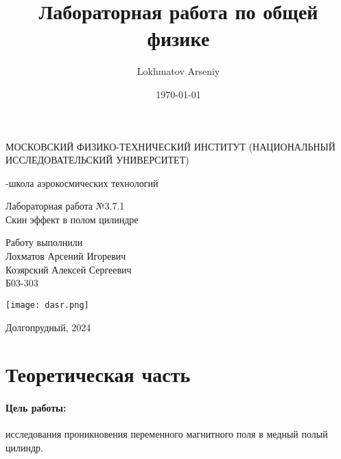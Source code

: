 \documentclass[a4paper,12pt]{article} %
\author{Lokhmatov Arseniy}
\title{Лабораторная работа по общей физике}
\date{\today}
\begin{document}
\begin{titlepage}
    \newpage
    \begin{center}
    {\large МОСКОВСКИЙ ФИЗИКО-ТЕХНИЧЕСКИЙ ИНСТИТУТ (НАЦИОНАЛЬНЫЙ ИССЛЕДОВАТЕЛЬСКИЙ УНИВЕРСИТЕТ)}
    \vspace{1cm}

    {-школа аэрокосмических технологий}
    \vspace{6em}
    \end{center}
    
    \vspace{1.2em}

    \begin{center}
    \Large Лабораторная работа №3.7.1 \\
    Скин эффект в полом цилиндре
    \linebreak
    \end{center}
    
    \vspace{11em}
    
    \begin{flushright}
                       {\large Работу выполнили\\
                       Лохматов Арсений Игоревич\\
                       Козярский Алексей Сергеевич\\
                       Б03-303 }
    \end{flushright}

    \vspace{\fill}

    \begin{center}
        \texttt{[image: dasr.png]}
    \end{center}

    \begin{center}
    Долгопрудный, 2024
    \end{center}

    \end{titlepage}

\section{Теоретическая часть}

\paragraph{Цель работы:} исследования проникновения переменного магнитного поля в медный полый цилиндр.
\end{document}

